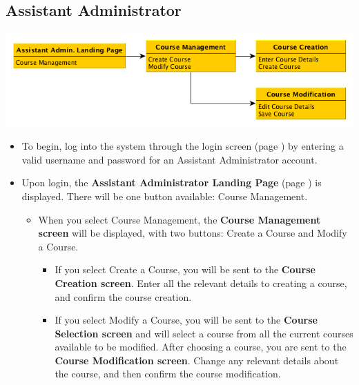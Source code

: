 \documentclass{article}
\begin{document}
\subsection{Assistant Administrator}
\centerline{\includegraphics[scale=.6]{../images/UIMockups/pngs/assistantAdmin}}
\begin{itemize}
	\item To begin, log into the system through the login screen (page \pageref{login})
		by entering a valid username and password for an Assistant Administrator 
		account.
	\item Upon login, the \textbf{Assistant Administrator Landing Page} (page
		\pageref{landPg}) is displayed. There will be one button available: Course
		Management.
	\begin{itemize}
		\item When you select Course Management, the \textbf{Course Management
		screen} will be displayed, with two buttons: Create a Course and Modify a 
		Course.
		\begin{itemize}
			\item If you select Create a Course, you will be sent to the \textbf{Course
				Creation screen}. Enter all the relevant details to creating a course, and
				confirm the course creation.
			\item If you select Modify a Course, you will be sent to the \textbf{Course
				Selection screen} and will select a course from all the current courses
				available to be modified. After choosing a course, you are sent to the
				\textbf{Course Modification screen}. Change any relevant details about
				the course, and then confirm the course modification.
		\end{itemize}
	\end{itemize}
\end{itemize}
\end{document}
